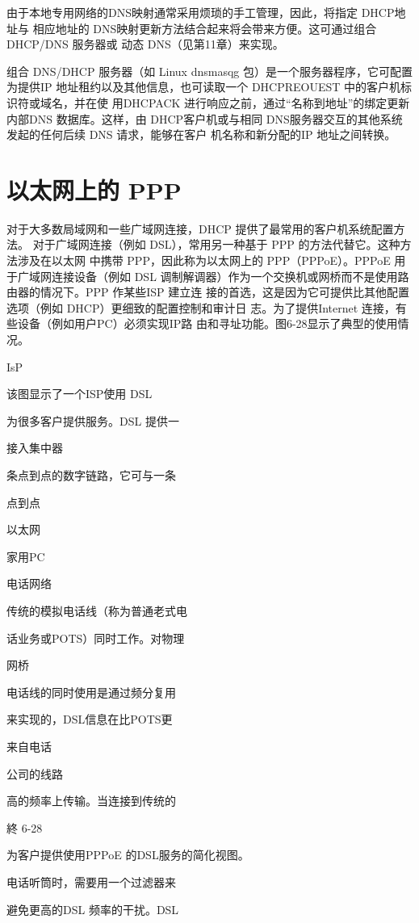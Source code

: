 由于本地专用网络的DNS映射通常采用烦琐的手工管理，因此，将指定 DHCP地址与
相应地址的 DNS映射更新方法结合起来将会带来方便。这可通过组合DHCP/DNS 服务器或
动态 DNS（见第11章）来实现。

组合 DNS/DHCP 服务器（如 Linux dnsmasqg 包）是一个服务器程序，它可配置为提供IP
地址租约以及其他信息，也可读取一个 DHCPREOUEST 中的客户机标识符或域名，并在使
用DHCPACK 进行响应之前，通过“名称到地址”的绑定更新内部DNS 数据库。这样，由
DHCP客户机或与相同 DNS服务器交互的其他系统发起的任何后续 DNS 请求，能够在客户
机名称和新分配的IP 地址之间转换。

\section{以太网上的 PPP}

对于大多数局域网和一些广域网连接，DHCP 提供了最常用的客户机系统配置方法。
对于广域网连接（例如 DSL），常用另一种基于 PPP 的方法代替它。这种方法涉及在以太网
中携带 PPP，因此称为以太网上的 PPP（PPPoE）。PPPoE 用于广域网连接设备（例如 DSL
调制解调器）作为一个交换机或网桥而不是使用路由器的情况下。PPP 作某些ISP 建立连
接的首选，这是因为它可提供比其他配置选项（例如 DHCP）更细致的配置控制和审计日
志。为了提供Internet 连接，有些设备（例如用户PC）必须实现IP路
由和寻址功能。图6-28显示了典型的使用情况。

IsP

该图显示了一个ISP使用 DSL

为很多客户提供服务。DSL 提供一

接入集中器

条点到点的数字链路，它可与一条

点到点

以太网

家用PC

电话网络

传统的模拟电话线（称为普通老式电

话业务或POTS）同时工作。对物理

网桥

电话线的同时使用是通过频分复用

来实现的，DSL信息在比POTS更

来自电话

公司的线路

高的频率上传输。当连接到传统的

終 6-28

为客户提供使用PPPoE 的DSL服务的简化视图。

电话听筒时，需要用一个过滤器来

避免更高的DSL 频率的干扰。DSL

